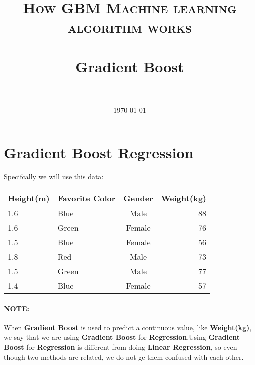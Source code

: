 \documentclass[12pt, a4paper]{article} %
\title{	
\normalfont \normalsize 
\textsc{How GBM Machine learning algorithm works} \\ [25pt] %
\horrule{0.5pt} \\[0.4cm] %
\huge Gradient Boost\\ %
\horrule{2pt} \\[0.5cm] %
}
\author{} %
\date{\today} %
\begin{document}
\maketitle %


\section{Gradient Boost Regression}
Specifcally we will use this data:

\begin{table}[h!]
\begin{center}
\begin{tabular}{m|l|c|r} %
    
    \hline
    \hline
    
         \textbf{Height(m)}
     
       & \textbf{Favorite Color}
      
       & \textbf{Gender}
       
       & \textbf{Weight(kg)}
       
      \\
      
      \hline
      \hline
      
      1.6 & Blue  & Male   & 88\\
      1.6 & Green & Female & 76\\
      1.5 & Blue  & Female & 56\\
      1.8 & Red   & Male   & 73\\
      1.5 & Green & Male   & 77\\
      1.4 & Blue  & Female & 57\\
      
      \hline
      \hline
      
\end{tabular}
\end{center}
\end{table}

\paragraph{NOTE:} When \textbf{Gradient Boost} is used to predict a continuous value, like \textbf{Weight(kg)}, we say that we are using \textbf{Gradient Boost} for \textbf{Regression}.Using \textbf{Gradient Boost} for \textbf{Regression} is different from doing \textbf{Linear Regression}, so even though two methods are related, we do not ge them confused with each other.
\end{document}
